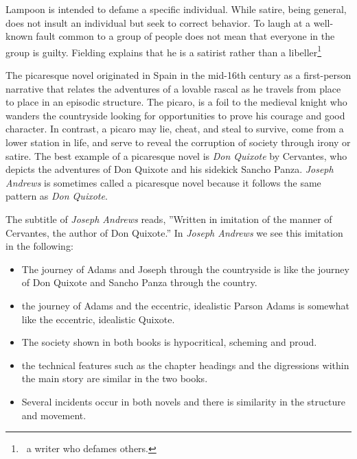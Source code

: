 \documentclass[12pt, a4paper]{article}
\begin{document}

\ind Lampoon is intended to defame a specific individual.
While satire, being general, does not insult an individual but seek to correct
behavior. To laugh at a well-known fault common to a group of people 
does not mean that everyone in the group is guilty. Fielding explains that he
is a satirist rather than a libeller\footnote{\, a writer who defames others.}






\ind The picaresque novel originated in Spain in the mid-16th century as a first-person 
narrative that relates the adventures of a lovable rascal as he travels from place to place in an 
episodic structure. The picaro, is a foil to the medieval knight who wanders the 
countryside looking for opportunities to prove his courage and good character. In 
contrast, a picaro may lie, cheat, and steal to survive, come from a lower station in life, and serve 
to reveal the corruption of society through irony or satire. The best example of a picaresque novel
is \textit{Don Quixote} by Cervantes, who depicts the adventures of Don Quixote and his sidekick Sancho Panza.
\textit{Joseph Andrews} is sometimes called a picaresque novel because it follows the same pattern as \textit{Don Quixote}.


\ind The subtitle of \textit{Joseph Andrews} reads, ”Written in imitation of the
manner of Cervantes, the author of Don Quixote.” In \textit{Joseph Andrews}
we see this imitation in the following: 

\begin{itemize}[itemsep=2pt]

\item The journey of Adams and  Joseph through the countryside is 
like the journey of Don Quixote and Sancho Panza through the country.
  
\item the journey of Adams and the eccentric, idealistic 
Parson Adams is somewhat like the eccentric, idealistic Quixote.

\item The society shown in both books is hypocritical, scheming and
proud. 

\item the technical features such as the chapter headings and
the digressions within the main story are similar in the two books.

\item Several incidents occur in both novels and there is similarity in
the structure and movement.

\end{itemize}
\end{document}
